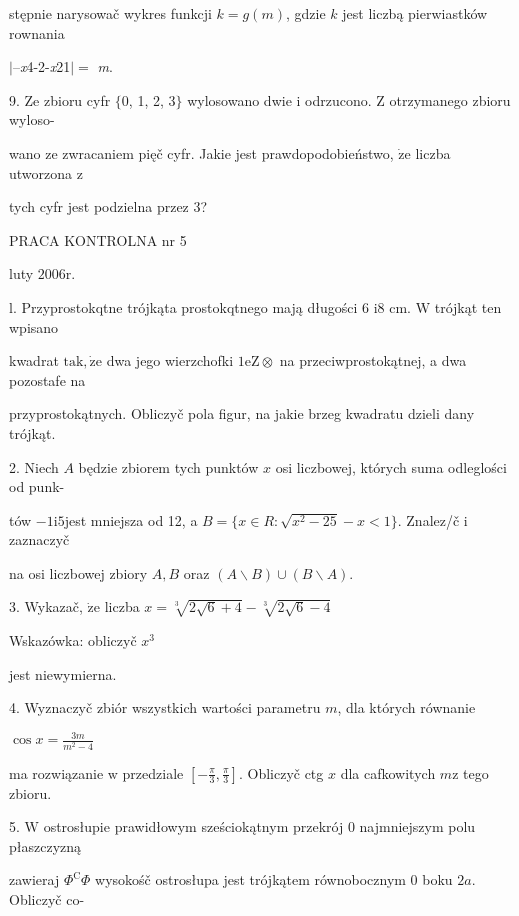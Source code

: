 \documentclass[a4paper,12pt]{article}
\begin{document}
stępnie narysowač wykres funkcji $k=g(m)$, gdzie $k$ jest liczbą pierwiastków rownania

$|$--{\it x}4-2-{\it x}21$|=$ {\it m}.

9. Ze zbioru cyfr $\{0$, 1, 2, 3$\}$ wylosowano dwie $\mathrm{i}$ odrzucono. $\mathrm{Z}$ otrzymanego zbioru wyloso-

wano ze zwracaniem pięč cyfr. Jakie jest prawdopodobieństwo, $\dot{\mathrm{z}}\mathrm{e}$ liczba utworzona $\mathrm{z}$

tych cyfr jest podzielna przez 3?





PRACA KONTROLNA nr 5

luty $2006\mathrm{r}.$

l. Przyprostokqtne trójkąta prostokqtnego mają długości 6 $\mathrm{i}8$ cm. $\mathrm{W}$ trójkąt ten wpisano

kwadrat $\mathrm{t}\mathrm{a}\mathrm{k}, \dot{\mathrm{z}}\mathrm{e}$ dwa jego wierzchofki $ 1\mathrm{e}\mathrm{Z}\otimes$ na przeciwprostokątnej, a dwa pozostafe na

przyprostokątnych. Obliczyč pola figur, na jakie brzeg kwadratu dzieli dany trójkąt.

2. Niech $A$ będzie zbiorem tych punktów $x$ osi liczbowej, których suma odleglości od punk-

tów $-1\mathrm{i}5$jest mniejsza od 12, a $B=\{x\in R:\sqrt{x^{2}-25}-x<1\}$. Znalez/č $\mathrm{i}$ zaznaczyč

na osi liczbowej zbiory $A, B$ oraz $(A\backslash B)\cup(B\backslash A).$

3. Wykazač, $\dot{\mathrm{z}}\mathrm{e}$ liczba $x=\sqrt[3]{2\sqrt{6}+4}-\sqrt[3]{2\sqrt{6}-4}$

Wskazówka: obliczyč $x^{3}$

jest niewymierna.

4. Wyznaczyč zbiór wszystkich wartości parametru $m$, dla których równanie

$\displaystyle \cos x=\frac{3m}{m^{2}-4}$

ma rozwiązanie $\mathrm{w}$ przedziale $[-\displaystyle \frac{\pi}{3},\frac{\pi}{3}]$. Obliczyč ctg $x$ dla cafkowitych $m\mathrm{z}$ tego zbioru.

5. $\mathrm{W}$ ostrosłupie prawidłowym sześciokątnym przekrój $0$ najmniejszym polu płaszczyzną

zawieraj $\Phi^{\mathrm{C}}\Phi$ wysokośč ostrosłupa jest trójkątem równobocznym $0$ boku $2a$. Obliczyč co-
\end{document}
